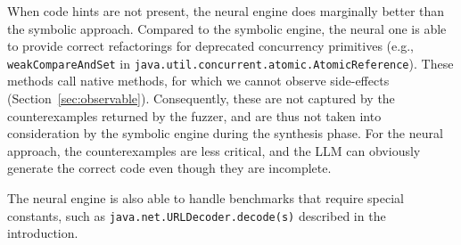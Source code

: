 \documentclass[sigconf,review,anonymous]{acmart}
\begin{document}
When code hints are not present, the neural engine does mar\-gin\-al\-ly better
than the symbolic approach.
%
%
%
%
Compared to the symbolic engine, the neural one is able to provide correct
refactorings for deprecated concurrency primitives (e.g.,
\lstinline{weakCompareAndSet} in
\lstinline[breaklines=true]{java.util.concurrent.atomic.AtomicReference}). 
These methods call native methods, for which we cannot observe side-effects
(Section~\ref{sec:observable}).  Consequently, these are not captured by
the counterexamples returned by the fuzzer, and are thus not taken into
consideration by the symbolic engine during the synthesis phase.  For the
neural approach, the counterexamples are less critical, and the LLM can
obviously generate the correct code even though they are incomplete.

%
The neural engine is also able to handle benchmarks that require special
constants, such as
\lstinline[breaklines=true]{java.net.URLDecoder.decode(s)} described in the
introduction.






\end{document}
